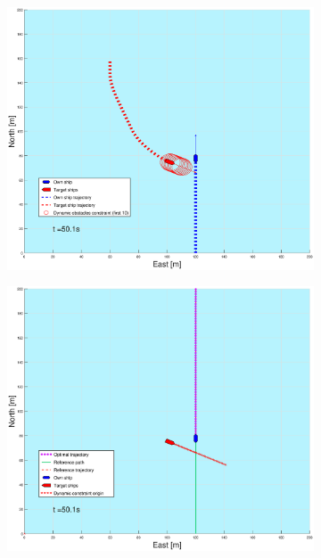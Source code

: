 \begin{figure}[!b]
\begin{subfigure}[b]{0.499\textwidth}
    \end{subfigure}
    \hfill
    \\
    \begin{subfigure}[b]{0.49\textwidth}
        \centering
        \includegraphics[width=\textwidth]{Images/Figures/sving_SO/_Simple_1fig1_time=50}
    \end{subfigure}
    \hfill
    \begin{subfigure}[b]{0.499\textwidth}
        \centering
        \includegraphics[width=\textwidth]{Images/Figures/sving_SO/_Simple_1fig999_time=50}
    \end{subfigure}
    \hfill
\end{figure}%
